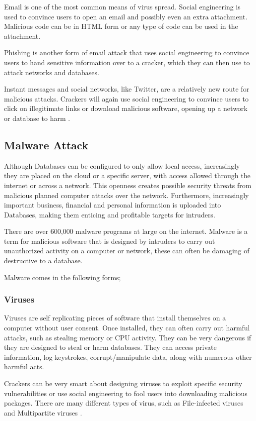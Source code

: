 \documentclass[11pt, twocolumn]{article}
\begin{document}
Email is one of the most common means of virus spread.  Social engineering is used to convince users to open an email and possibly even an extra attachment.  Malicious code can be in HTML form or any type of code can be used in the attachment.

Phishing is another form of email attack that uses social engineering to convince users to hand sensitive information over to a cracker, which they can then use to attack networks and databases.

Instant messages and social networks, like Twitter, are a relatively new route for malicious attacks.  Crackers will again use social engineering to convince users to click on illegitimate links or download malicious software, opening up a network or database to harm \cite{Bas}.

\subsection{Malware Attack}

Although Databases can be configured to only allow local access, increasingly they are placed on the cloud or a specific server, with access allowed through the internet or across a network.  This openness creates possible security threats from malicious planned computer attacks over the network.  Furthermore, increasingly important business, financial and personal information is uploaded into Databases, making them enticing and profitable targets for intruders.

There are over 600,000 malware programs at large on the internet.  Malware is a term for malicious software that is designed by intruders to carry out unauthorized activity on a computer or network, these can often be damaging of destructive to a database.

Malware comes in the following forms;

\subsubsection{Viruses}
Viruses are self replicating pieces of software that install themselves on a computer without user consent.  Once installed, they can often carry out harmful attacks, such as stealing memory or CPU activity. They can be very dangerous if they are designed to steal or harm databases.  They can access private information, log keystrokes, corrupt/manipulate data, along with numerous other harmful acts.

Crackers can be very smart about designing viruses to exploit specific security vulnerabilities or use social engineering to fool users into downloading malicious packages.  There are many different types of virus, such as File-infected viruses and Multipartite viruses \cite{Bas}.
\end{document}

